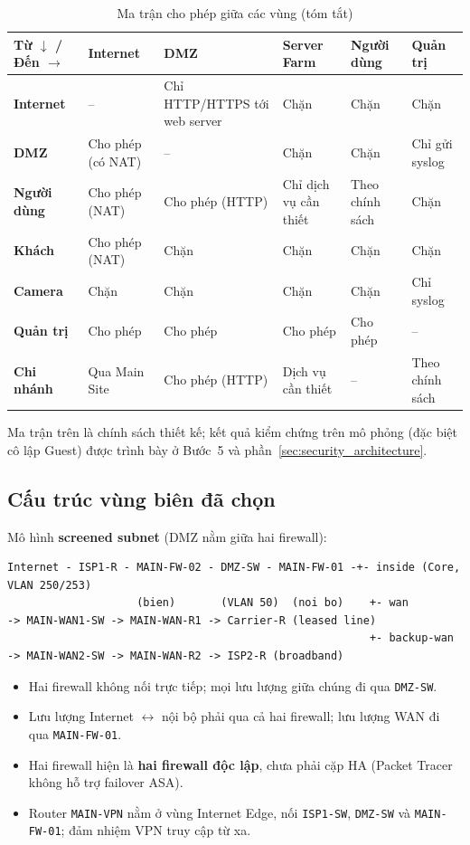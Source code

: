 \begin{small}
\setlength{\tabcolsep}{3pt}
\begin{longtable}{|p{2.0cm}|p{2.0cm}|p{2.6cm}|p{2.2cm}|p{2.4cm}|p{2.2cm}|}
\caption{Ma trận cho phép giữa các vùng (tóm tắt)} \label{tab:zone_matrix} \\
\hline
\textbf{Từ $\downarrow$ / Đến $\rightarrow$} & \textbf{Internet} & \textbf{DMZ} & \textbf{Server Farm} & \textbf{Người dùng} & \textbf{Quản trị} \\ \hline
\endhead
\textbf{Internet} & -- & Chỉ HTTP/HTTPS tới web server & Chặn & Chặn & Chặn \\ \hline
\textbf{DMZ} & Cho phép (có NAT) & -- & Chặn & Chặn & Chỉ gửi syslog \\ \hline
\textbf{Người dùng} & Cho phép (NAT) & Cho phép (HTTP) & Chỉ dịch vụ cần thiết & Theo chính sách & Chặn \\ \hline
\textbf{Khách} & Cho phép (NAT) & Chặn & Chặn & Chặn & Chặn \\ \hline
\textbf{Camera} & Chặn & Chặn & Chặn & Chặn & Chỉ syslog \\ \hline
\textbf{Quản trị} & Cho phép & Cho phép & Cho phép & Cho phép & -- \\ \hline
\textbf{Chi nhánh} & Qua Main Site & Cho phép (HTTP) & Dịch vụ cần thiết & -- & Theo chính sách \\ \hline
\end{longtable}
\end{small}
\noindent Ma trận trên là chính sách thiết kế; kết quả kiểm chứng trên mô phỏng (đặc biệt cô lập Guest) được trình bày ở Bước~5 và phần~\ref{sec:security_architecture}.

\subsection{Cấu trúc vùng biên đã chọn}
Mô hình \textbf{screened subnet} (DMZ nằm giữa hai firewall):
\begin{lstlisting}[language={},basicstyle=\ttfamily\footnotesize,caption={Cấu trúc vùng biên Main Site}]
Internet - ISP1-R - MAIN-FW-02 - DMZ-SW - MAIN-FW-01 -+- inside (Core, VLAN 250/253)
                    (bien)       (VLAN 50)  (noi bo)    +- wan        -> MAIN-WAN1-SW -> MAIN-WAN-R1 -> Carrier-R (leased line)
                                                        +- backup-wan -> MAIN-WAN2-SW -> MAIN-WAN-R2 -> ISP2-R (broadband)
\end{lstlisting}
\begin{itemize}[noitemsep,topsep=2pt]
    \item Hai firewall không nối trực tiếp; mọi lưu lượng giữa chúng đi qua \texttt{DMZ-SW}.
    \item Lưu lượng Internet $\leftrightarrow$ nội bộ phải qua cả hai firewall; lưu lượng WAN đi qua \texttt{MAIN-FW-01}.
    \item Hai firewall hiện là \textbf{hai firewall độc lập}, chưa phải cặp HA (Packet Tracer không hỗ trợ failover ASA).
    \item Router \texttt{MAIN-VPN} nằm ở vùng Internet Edge, nối \texttt{ISP1-SW}, \texttt{DMZ-SW} và \texttt{MAIN-FW-01}; đảm nhiệm VPN truy cập từ xa.
\end{itemize}
